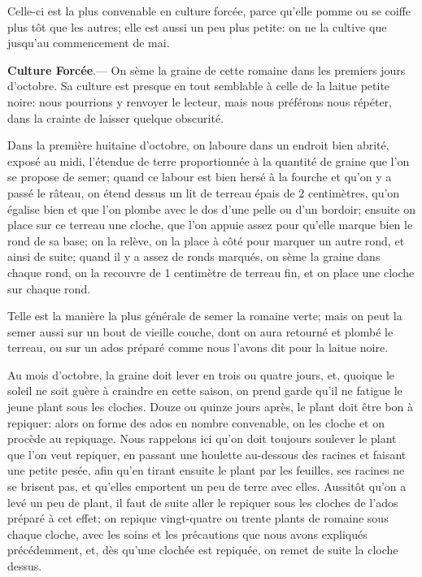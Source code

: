 \documentclass[10pt,a4paper]{book}
\begin{document}
Celle-ci est la plus convenable en culture forcée, parce qu'elle pomme ou se coiffe plus tôt que les autres; elle est aussi un peu plus petite: on ne la cultive que jusqu'au commencement de mai.

\textbf{Culture Forcée}.--- On sème la graine de cette romaine dans les premiers jours d'octobre. Sa culture est presque en tout semblable à celle de la laitue petite noire: nous pourrions y renvoyer le lecteur, mais nous préférons nous répéter, dans la crainte de laisser quelque obscurité.

Dans la première huitaine d'octobre, on laboure dans un endroit bien abrité, exposé au midi, l'étendue de terre proportionnée à la quantité de graine que l'on se propose de semer; quand ce labour est bien hersé à la fourche et qu'on y a passé le râteau, on étend dessus un lit de terreau épais de 2 centimètres, qu'on égalise bien et que l'on plombe avec le dos d'une pelle ou d'un bordoir; ensuite on place sur ce terreau une cloche, que l'on appuie assez pour qu'elle marque bien le rond de sa base; on la relève, on la place à côté pour marquer un autre rond, et ainsi de suite; quand il y a assez de ronds marqués, on sème la graine dans chaque rond, on la recouvre de 1 centimètre de terreau fin, et on place une cloche sur chaque rond.

Telle est la manière la plus générale de semer la romaine verte; mais on peut la semer aussi sur un bout de vieille couche, dont on aura retourné et plombé le terreau, ou sur un ados préparé comme nous l'avons dit pour la laitue noire.

Au mois d'octobre, la graine doit lever en trois ou quatre jours, et, quoique le soleil ne soit guère à craindre en cette saison, on prend garde qu'il ne fatigue le jeune plant sous les cloches. Douze ou quinze jours après, le plant doit être bon à repiquer: alors on forme des ados en nombre convenable, on les cloche et on procède au repiquage. Nous rappelons ici qu'on doit toujours soulever le plant que l'on veut repiquer, en passant une houlette au-dessous des racines et faisant une petite pesée, afin qu'en tirant ensuite le plant par les feuilles, ses racines ne se brisent pas, et qu'elles emportent un peu de terre avec elles. Aussitôt qu'on a levé un peu de plant, il faut de suite aller le repiquer sous les cloches de l'ados préparé à cet effet; on repique vingt-quatre ou trente plants de romaine sous chaque cloche, avec les soins et les précautions que nous avons expliqués précédemment, et, dès qu'une clochée est repiquée, on remet de suite la cloche dessus.
\end{document}
